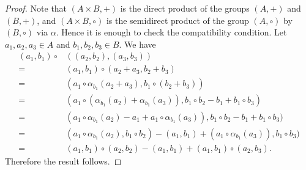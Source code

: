 \begin{proof}
    Note that $(A\times B,+)$ is the direct product of the groups $(A,+)$ and $(B,+)$, and $(A\times B,\circ)$ is the semidirect product of the group $(A,\circ)$ by $(B,\circ)$ via $\alpha$. Hence it is enough to check the compatibility condition.
    Let $a_1,a_2,a_3\in A$ and $b_1,b_2,b_3\in B$. We have
    \begin{align*}
        (a_1,b_1)\circ &((a_2,b_2),(a_3,b_3))\\
        =&(a_1,b_1)\circ (a_2+a_3,b_2+b_3)\\
        =&(a_1\circ \alpha_{b_1}(a_2+a_3),b_1\circ (b_2+b_3))\\
        =&(a_1\circ (\alpha_{b_1}(a_2)+\alpha_{b_1}(a_3)),b_1\circ b_2-b_1+b_1\circ b_3)\\
        =&(a_1\circ \alpha_{b_1}(a_2)-a_1+a_1\circ\alpha_{b_1}(a_3)),b_1\circ b_2-b_1+b_1\circ b_3)\\
        =&(a_1\circ \alpha_{b_1}(a_2),b_1\circ b_2)-(a_1,b_1)+(a_1\circ\alpha_{b_1}(a_3)),b_1\circ b_3)\\
        =&(a_1,b_1)\circ (a_2,b_2)-(a_1,b_1)+(a_1,b_1)\circ (a_2,b_3).
    \end{align*}
Therefore the result follows.
\end{proof}

